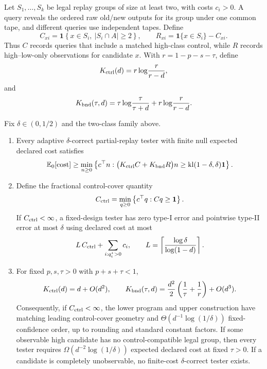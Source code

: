 Let \(S_1,\ldots,S_k\) be legal replay groups of size at least two, with costs
\(c_i>0\).  A query reveals the ordered raw old/new outputs for its group under
one common tape, and different queries use independent tapes.  Define
\[
C_{x i}
=
\mathbf 1\!\left\{
x\in S_i,\ |S_i\cap A|\ge2
\right\},
\qquad
R_{x i}
=
\mathbf 1\{x\in S_i\}-C_{x i}.
\]
Thus \(C\) records queries that include a matched high-class control, while
\(R\) records high--low-only observations for candidate \(x\).  With
\(r=1-p-s-\tau\), define
\[
K_{\rm ctrl}(d)
=
r\log\!\frac{r}{r-d},
\]
and
\[
K_{\rm bnd}(\tau,d)
=
\tau\log\!\frac{\tau}{\tau+d}
+
r\log\!\frac{r}{r-d}.
\]

\begin{theorem}
\label{thm:control-replay}
Fix \(\delta\in(0,1/2)\) and the two-class family above.

\begin{enumerate}[label=(\roman*)]
\item Every adaptive \(\delta\)-correct partial-replay tester with finite null
expected declared cost satisfies
\[
\mathbb{E}_0[\mathrm{cost}]
\ge
\min_{n\ge0}
\left\{
c^\top n:
\bigl(K_{\rm ctrl}C+K_{\rm bnd}R\bigr)n
\ge
\mathrm{kl}(1-\delta,\delta)\mathbf 1
\right\}.
\]

\item Define the fractional control-cover quantity
\[
C_{\rm ctrl}
=
\min_{q\ge0}
\left\{
c^\top q:
Cq\ge\mathbf 1
\right\}.
\]
If \(C_{\rm ctrl}<\infty\), a fixed-design tester has zero type-I error and
pointwise type-II error at most \(\delta\) using declared cost at most
\[
L\,C_{\rm ctrl}
+
\sum_{i:q_i^\star>0}c_i,
\qquad
L=
\left\lceil
\frac{\log\delta}{\log(1-d)}
\right\rceil.
\]

\item For fixed \(p,s,\tau>0\) with \(p+s+\tau<1\),
\[
K_{\rm ctrl}(d)=d+O(d^2),
\qquad
K_{\rm bnd}(\tau,d)
=
\frac{d^2}{2}
\left(
\frac1\tau+\frac1r
\right)
+O(d^3).
\]
Consequently, if \(C_{\rm ctrl}<\infty\), the lower program and upper
construction have matching leading control-cover geometry and
\(\Theta(d^{-1}\log(1/\delta))\) fixed-confidence order, up to rounding and
standard constant factors.  If some observable high candidate has no
control-compatible legal group, then every tester requires
\(\Omega(d^{-2}\log(1/\delta))\) expected declared cost at fixed
\(\tau>0\).  If a candidate is completely unobservable, no finite-cost
\(\delta\)-correct tester exists.


\end{enumerate}
\end{theorem}
